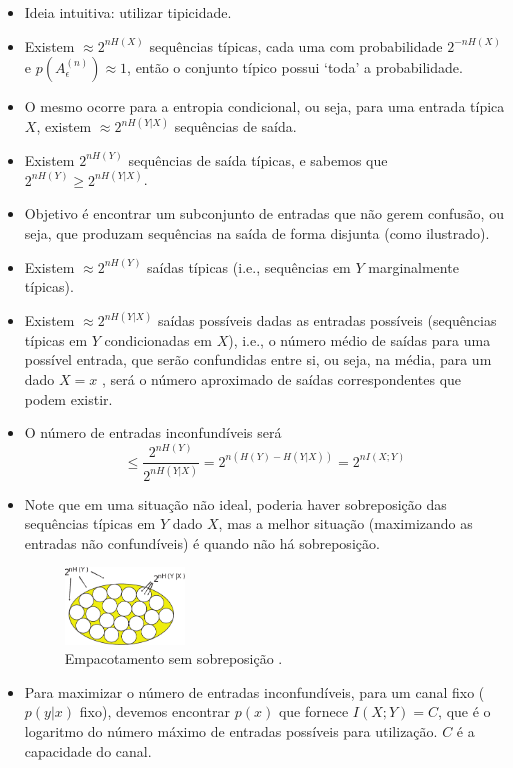\begin{frame}[allowframebreaks]
\begin{itemize}
  \item Ideia intuitiva: utilizar tipicidade.
  \item Existem $\approx 2^{nH(X)}$ sequências típicas, cada uma com probabilidade $2^{-nH(X)}$ e
	$p(A^{(n)}_{\epsilon}) \approx 1$, então o conjunto típico possui `toda' a probabilidade.
  \item O mesmo ocorre para a entropia condicional, ou seja, para uma entrada típica $X$,
 	existem $\approx 2^{nH(Y|X)}$ sequências de saída.
  \item Existem $2^{nH(Y)}$ sequências de saída típicas, e sabemos que $2^{nH(Y)} \geq 2^{nH(Y|X)}$.
  \item Objetivo é encontrar um subconjunto de entradas que não gerem confusão, ou seja,
	que produzam sequências na saída de forma disjunta (como ilustrado).
  \item Existem $\approx 2^{nH(Y)}$ saídas típicas (i.e., sequências em $Y$ marginalmente típicas).
  \item Existem $\approx 2^{nH(Y|X)}$ saídas possíveis dadas as entradas possíveis 
	(sequências típicas em $Y$ condicionadas em $X$), i.e., o número médio de saídas para uma
	possível entrada, que serão confundidas entre si, ou seja, na média, para um dado $X=x$ ,
	será o número aproximado de saídas correspondentes que podem existir.
  \item O número de entradas inconfundíveis será 
	\begin{equation}
	\leq \frac{2^{nH(Y)}}{2^{nH(Y|X)}} = 2^{n( H(Y) - H(Y|X) )} = 2^{nI(X;Y)}
	\end{equation}
  \item Note que em uma situação não ideal, poderia haver sobreposição das sequências
	típicas em $Y$ dado $X$, mas a melhor situação (maximizando as entradas não confundíveis) 
	é quando não há sobreposição. 

                \begin{figure}[h!]
                \centering
                \includegraphics[width=0.3\textwidth]{images/ncset.pdf}
		\caption{Empacotamento sem sobreposição \citep{bilmes2013}.}
                \label{fig:ncset}
                \end{figure}

  \item Para maximizar o número de entradas inconfundíveis, para um canal fixo
	($p(y|x)$ fixo), devemos encontrar $p(x)$ que fornece $I(X;Y) = C$, que é
	o logaritmo do número máximo de entradas possíveis para utilização.
	$C$ é a capacidade do canal.
  \end{itemize}

\end{frame}




